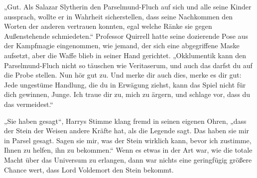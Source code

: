 „Gut. Als Salazar Slytherin den Parselmund-Fluch auf sich und alle seine Kinder aussprach, wollte er in Wahrheit sicherstellen, dass seine Nachkommen den Worten der anderen vertrauen konnten, egal welche Ränke sie gegen Außenstehende schmiedeten.“
Professor Quirrell hatte seine dozierende Pose aus der Kampfmagie eingenommen, wie jemand, der sich eine abgegriffene Maske aufsetzt, aber die Waffe blieb in seiner Hand gerichtet.
„Okklumentik kann den Parselmund-Fluch nicht so täuschen wie Veritaserum, und auch das darfst du auf die Probe stellen. Nun hör gut zu.  Und merke dir auch dies, merke es dir gut:  Jede ungestüme Handlung, die du in Erwägung ziehst, kann das Spiel nicht für dich gewinnen, Junge. Ich traue dir zu, mich zu ärgern, und schlage vor, dass du das vermeidest.“

„Sie haben gesagt“, Harrys Stimme klang fremd in seinen eigenen Ohren, „dass der Stein der Weisen andere Kräfte hat, als die Legende sagt. Das haben sie mir in Parsel gesagt. Sagen sie mir, was der Stein wirklich kann, bevor ich zustimme, Ihnen zu helfen, ihn zu bekommen.“
Wenn es etwas in der Art war, wie die totale Macht über das Universum zu erlangen, dann war nichts eine geringfügig größere Chance wert, dass Lord Voldemort den Stein bekommt.

